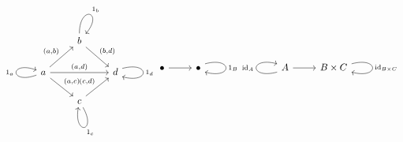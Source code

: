 \documentclass{standalone}
\begin{document}
$
	\begin{tikzcd}
		& \arrow[out=90,in=50,loop, distance=3em, "1_b"] b  \arrow[rd, "{(b,d)}"] &   \\
		a \arrow[out=200,in=160, distance=3em, "1_a"] \arrow[rr, "{(a,d)}"] \arrow[ru, "{(a,b)}"] \arrow[rd, "{(a,c)}"] &                         & d \arrow[loop right, distance=3em, start anchor={[yshift=1ex]east}, end anchor={[yshift=-1ex]east}]{}{1_d}\\
		& c \arrow[out=300,in=260,loop, distance=3em, "1_c"] \arrow[ru, "{(c,d)}"] &  
	\end{tikzcd}
	\begin{tikzcd}[cells={nodes={}}]
		\arrow{r}\bullet 
		& \bullet\arrow[loop right, distance=3em, start anchor={[yshift=1ex]east}, end anchor={[yshift=-1ex]east}]{}{1_B} 
	\end{tikzcd}
	\begin{tikzcd}[cells={nodes={}}]
	\arrow[loop left, distance=3em, start anchor={[yshift=-1ex]west}, end anchor={[yshift=1ex]west}]{}{\mathrm{id}_A} \arrow{r} A 
	& B\times C\arrow[loop right, distance=3em, start anchor={[yshift=1ex]east}, end anchor={[yshift=-1ex]east}]{}{\mathrm{id}_{B\times C}} 
	\end{tikzcd}$
\end{document}
